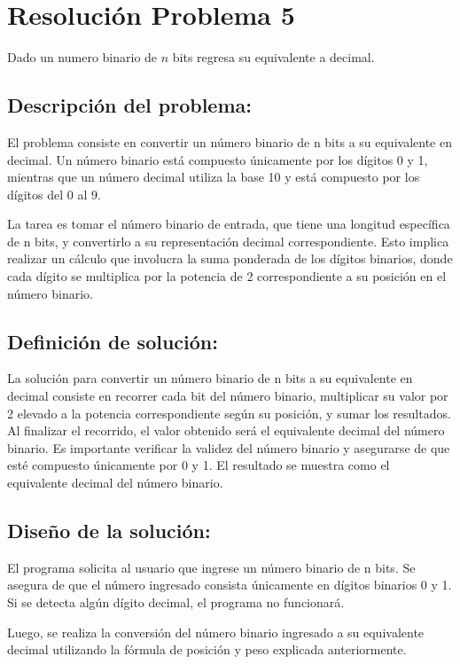 \section{Resolución Problema 5}
Dado un numero binario de $n$ bits regresa su equivalente a decimal.


\subsection{\textbf{Descripción del problema:}}

El problema consiste en convertir un número binario de n bits a su equivalente en decimal. Un número binario está compuesto únicamente por los dígitos 0 y 1, mientras que un número decimal utiliza la base 10 y está compuesto por los dígitos del 0 al 9.

La tarea es tomar el número binario de entrada, que tiene una longitud específica de n bits, y convertirlo a su representación decimal correspondiente. Esto implica realizar un cálculo que involucra la suma ponderada de los dígitos binarios, donde cada dígito se multiplica por la potencia de 2 correspondiente a su posición en el número binario.

\subsection{\textbf{Definición de solución:}}
La solución para convertir un número binario de n bits a su equivalente en decimal consiste en recorrer cada bit del número binario, multiplicar su valor por 2 elevado a la potencia correspondiente según su posición, y sumar los resultados. Al finalizar el recorrido, el valor obtenido será el equivalente decimal del número binario. Es importante verificar la validez del número binario y asegurarse de que esté compuesto únicamente por 0 y 1. El resultado se muestra como el equivalente decimal del número binario.


\subsection{\textbf{Diseño de la solución:}}
El programa solicita al usuario que ingrese un número binario de n bits. Se asegura de que el número ingresado consista únicamente en dígitos binarios 0 y 1. Si se detecta algún dígito decimal, el programa no funcionará.

Luego, se realiza la conversión del número binario ingresado a su equivalente decimal utilizando la fórmula de posición y peso explicada anteriormente.

